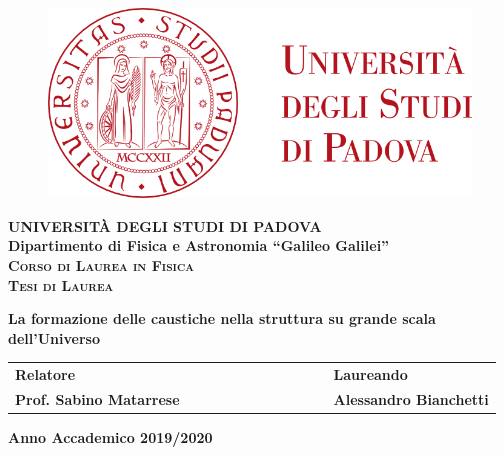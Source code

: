 \frontmatter
\begin{titlepage}
\vspace{5mm}
\begin{figure}[hbtp]
\centering
\includegraphics[scale=0.4]{unipd_logo.png}
\end{figure}
\vspace{5mm}
\begin{center}
{{\huge{\textsc{\bf UNIVERSIT\`A DEGLI STUDI DI PADOVA}}}\\}
\vspace{5mm}
{\Large{\bf Dipartimento di Fisica e Astronomia ``Galileo Galilei''}} \\
\vspace{5mm}
{\Large{\textsc{\bf Corso di Laurea in Fisica}}}\\
\vspace{20mm}
{\Large{\textsc{\bf Tesi di Laurea}}}\\
\vspace{30mm}
\begin{spacing}{3}
{\LARGE \textbf{La formazione delle caustiche nella struttura su grande scala dell'Universo}}\\
\end{spacing}
\vspace{8mm}
\end{center}

\vspace{20mm}
\begin{spacing}{2}
\begin{tabular}{ l  c  c c c  cc c c c c  l }
{\Large{\bf Relatore}} &&&&&&&&&&& {\Large{\bf Laureando}}\\
{\Large{\bf Prof. Sabino Matarrese}} &&&&&&&&&&& {\Large{\bf Alessandro Bianchetti}}\\

\end{tabular}
\end{spacing}
\vspace{15 mm}

\begin{center}
{\Large{\bf Anno Accademico 2019/2020}}
\end{center}
\end{titlepage}
\clearpage{\pagestyle{empty}\cleardoublepage}

